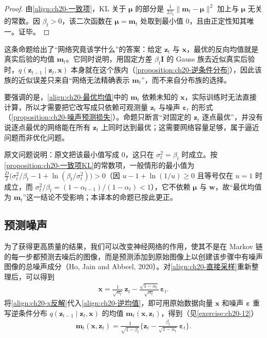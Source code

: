 \documentclass[../../main.tex]{subfiles}
\begin{document}
\begin{proof}
由\eqref{align:ch20-一致项}，KL 关于 $\bm{\mu}$ 的部分是 $\frac{1}{2\beta_t}\|\bm{m}_t-\bm{\mu}\|^2$ 加上与 $\bm{\mu}$ 无关的常数。因 $\beta_t>0$，该二次函数在 $\bm{\mu}=\bm{m}_t$ 处取到最小值 $0$，且由正定性知其唯一。证毕。
\end{proof}

\begin{remark}
这条命题给出了“网络究竟该学什么”的答案：给定 $\bm{z}_t$ 与 $\bm{x}$，最优的反向均值就是真实后验的均值 $\bm{m}_t$。它同时说明，用固定方差 $\beta_t\bm{I}$ 的 Gauss 族去近似真实后验时，$q(\bm{z}_{t-1}\mid\bm{z}_t,\bm{x})$ 本身就在这个族内（\cref{proposition:ch20-逆条件分布}），因此该族的近似误差只来自“网络无法精确表示 $\bm{m}_t$”，而不来自分布族的选择。\par
要强调的是，\eqref{align:ch20-最优均值}中的 $\bm{m}_t$ 依赖未知的 $\bm{x}$，实际训练时无法直接计算，所以才需要把它改写成只依赖可观测量 $\bm{z}_t$ 与噪声 $\bm{\varepsilon}_t$ 的形式（\cref{proposition:ch20-噪声预测损失}）。命题只断言“对固定的 $\bm{z}_t$ 逐点最优”，并没有说逐点最优的网络能在所有 $\bm{z}_t$ 上同时达到最优；这需要网络容量足够，属于逼近问题而非优化问题。

原文问题说明：原文把该最小值写成 $0$，这只在 $\sigma_t^{2}=\beta_t$ 时成立。按\cref{proposition:ch20-一致项KL}的常数项，一般情形的最小值为 $\frac{D}{2}\big(\sigma_t^{2}/\beta_t-1+\ln(\beta_t/\sigma_t^{2})\big)>0$（因 $u-1+\ln(1/u)\geqslant0$ 且等号仅在 $u=1$ 时成立，而 $\sigma_t^{2}/\beta_t=(1-\alpha_{t-1})/(1-\alpha_t)<1$），它不依赖 $\bm{\mu}$ 与 $\bm{w}$，故“最优均值为 $\bm{m}_t$”这一结论不受影响；本译本的命题已按此更正。
\end{remark}

\subsection{预测噪声}\label{subsection:ch20-预测噪声}

为了获得更高质量的结果，我们可以改变神经网络的作用，使其不是在 Markov 链的每一步都预测去噪后的图像，而是预测添加到原始图像上以创建该步骤中有噪声图像的总噪声成分（Ho, Jain and Abbeel, 2020）。对\eqref{align:ch20-直接采样}重新整理后，可以得到
\begin{align}
\bm{x}=\frac{1}{\sqrt{\alpha_t}}\,\bm{z}_t-\frac{\sqrt{1-\alpha_t}}{\sqrt{\alpha_t}}\,\bm{\varepsilon}_t.
\label{align:ch20-x反解}
\end{align}
将\eqref{align:ch20-x反解}代入\eqref{align:ch20-逆均值}，即可用原始数据向量 $\bm{x}$ 和噪声 $\bm{\varepsilon}$ 重写逆条件分布 $q(\bm{z}_{t-1}\mid\bm{z}_t,\bm{x})$ 的均值 $\bm{m}_t(\bm{x},\bm{z}_t)$，得到（见\cref{exercise:ch20-12}）
\begin{align}
\bm{m}_t(\bm{x},\bm{z}_t)=\frac{1}{\sqrt{1-\beta_t}}\Big\{\bm{z}_t-\frac{\beta_t}{\sqrt{1-\alpha_t}}\,\bm{\varepsilon}_t\Big\}.
\label{align:ch20-均值重写}
\end{align}
\end{document}
